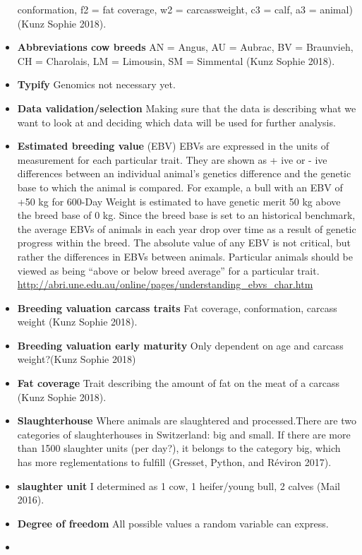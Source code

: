 \documentclass[]{article}
\begin{document}
\begin{itemize}
  conformation, f2 = fat coverage, w2 = carcassweight, c3 = calf, a3 =
  animal) (Kunz Sophie 2018).
\item
  \textbf{Abbreviations cow breeds} AN = Angus, AU = Aubrac, BV =
  Braunvieh, CH = Charolais, LM = Limousin, SM = Simmental (Kunz Sophie
  2018).
\item
  \textbf{Typify} Genomics not necessary yet.
\item
  \textbf{Data validation/selection} Making sure that the data is
  describing what we want to look at and deciding which data will be
  used for further analysis.
\item
  \textbf{Estimated breeding value} (EBV) EBVs are expressed in the
  units of measurement for each particular trait. They are shown as +
  ive or - ive differences between an individual animal's genetics
  difference and the genetic base to which the animal is compared. For
  example, a bull with an EBV of +50 kg for 600-Day Weight is estimated
  to have genetic merit 50 kg above the breed base of 0 kg. Since the
  breed base is set to an historical benchmark, the average EBVs of
  animals in each year drop over time as a result of genetic progress
  within the breed. The absolute value of any EBV is not critical, but
  rather the differences in EBVs between animals. Particular animals
  should be viewed as being ``above or below breed average'' for a
  particular trait.
  \url{http://abri.une.edu.au/online/pages/understanding_ebvs_char.htm}
\item
  \textbf{Breeding valuation carcass traits} Fat coverage, conformation,
  carcass weight (Kunz Sophie 2018).
\item
  \textbf{Breeding valuation early maturity} Only dependent on age and
  carcass weight?(Kunz Sophie 2018)
\item
  \textbf{Fat coverage} Trait describing the amount of fat on the meat
  of a carcass (Kunz Sophie 2018).
\item
  \textbf{Slaughterhouse} Where animals are slaughtered and
  processed.There are two categories of slaughterhouses in Switzerland:
  big and small. If there are more than 1500 slaughter units (per day?),
  it belongs to the category big, which has more reglementations to
  fulfill (Gresset, Python, and Réviron 2017).
\item
  \textbf{slaughter unit} I determined as 1 cow, 1 heifer/young bull, 2
  calves (Mail 2016).
\item
  \textbf{Degree of freedom} All possible values a random variable can
  express.
\item

\end{itemize}
\end{document}
